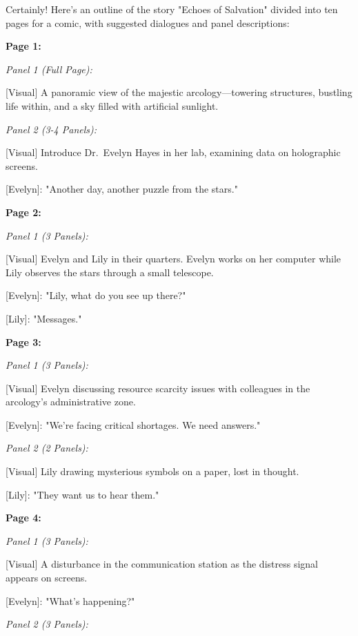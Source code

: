 \begin{aquote}
    Certainly! Here's an outline of the story "Echoes of Salvation" divided into ten pages for a comic, with suggested dialogues and panel descriptions:\medskip

    \noindent\textbf{Page 1:}\smallskip

    \noindent\emph{Panel 1 (Full Page):}

    [Visual] A panoramic view of the majestic arcology—towering structures, bustling life within, and a sky filled with artificial sunlight.\smallskip

    \noindent\emph{Panel 2 (3-4 Panels):}

    [Visual] Introduce Dr.~Evelyn Hayes in her lab, examining data on holographic screens.

    [Evelyn]: "Another day, another puzzle from the stars."\medskip

    \noindent\textbf{Page 2:}\smallskip

    \noindent\emph{Panel 1 (3 Panels):}

    [Visual] Evelyn and Lily in their quarters. Evelyn works on her computer while Lily observes the stars through a small telescope.

    [Evelyn]: "Lily, what do you see up there?"

    [Lily]: "Messages."\medskip

    \noindent\textbf{Page 3:}\smallskip

    \noindent\emph{Panel 1 (3 Panels):}

    [Visual] Evelyn discussing resource scarcity issues with colleagues in the arcology's administrative zone.
    
    [Evelyn]: "We're facing critical shortages. We need answers."\smallskip

    \noindent\emph{Panel 2 (2 Panels):}

    [Visual] Lily drawing mysterious symbols on a paper, lost in thought.

    [Lily]: "They want us to hear them."\medskip

    \noindent\textbf{Page 4:}\smallskip

    \noindent\emph{Panel 1 (3 Panels):}

    [Visual] A disturbance in the communication station as the distress signal appears on screens.

    [Evelyn]: "What's happening?"\smallskip

    \noindent\emph{Panel 2 (3 Panels):}


\end{aquote}
